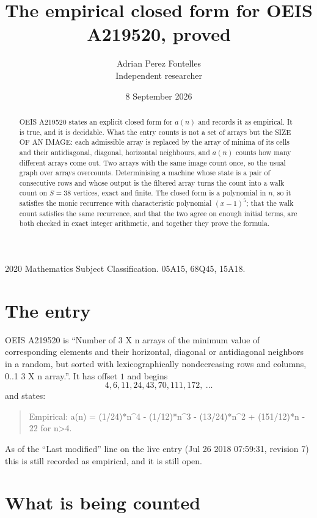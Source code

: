 \documentclass[11pt,a4paper]{article}
\title{The empirical closed form for OEIS A219520, proved}
\author{Adrian Perez Fontelles\\ \small Independent researcher}
\date{8 September 2026}
\theoremstyle{plain}
\theoremstyle{definition}
\begin{document}
\maketitle

\begin{abstract}
OEIS A219520 states an explicit closed form for $a(n)$ and records it as empirical. It is true, and
it is decidable. What the entry counts is not a set of arrays but the SIZE OF AN IMAGE: each
admissible array is replaced by the array of minima of its cells and their antidiagonal, diagonal, horizontal neighbours,
and $a(n)$ counts how many different arrays come out. Two arrays with the same image count
once, so the usual graph over arrays overcounts. Determinising a machine whose state is a pair
of consecutive rows and whose output is the filtered array turns the count into a walk count on
$S=38$ vertices, exact and finite. The closed form is a polynomial in $n$, so it satisfies the
monic recurrence with characteristic polynomial $(x-1)^{5}$; that the walk count
satisfies the same recurrence, and that the two agree on enough initial terms, are both checked
in exact integer arithmetic, and together they prove the formula.
\end{abstract}

\noindent\small 2020 Mathematics Subject Classification. 05A15, 68Q45, 15A18.\normalsize

\section{The entry}

OEIS A219520 is ``Number of 3 X n arrays of the minimum value of corresponding elements and their horizontal, diagonal or antidiagonal neighbors in a random, but sorted with lexicographically nondecreasing rows and columns, 0..1 3 X n array.''. It has offset $1$ and begins
\[
4, 6, 11, 24, 43, 70, 111, 172,\ \dots
\]
and states:
\begin{quote}
Empirical: a(n) = (1/24)*n\^{}4 - (1/12)*n\^{}3 - (13/24)*n\^{}2 + (151/12)*n - 22 for n>4.
\end{quote}
As of the ``Last modified'' line on the live entry (Jul 26 2018 07:59:31, revision 7)
this is still recorded as empirical, and it is still open.

\section{What is being counted}
\end{document}
